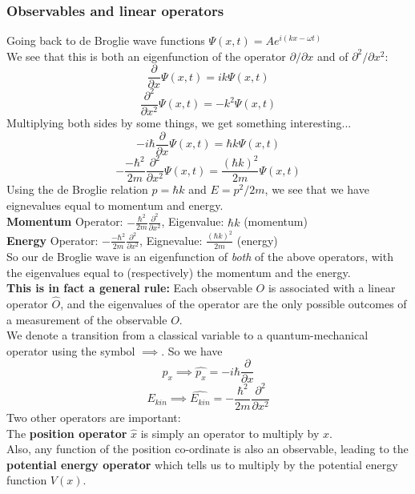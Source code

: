\documentclass{article}
\begin{document}
\subsubsection{Observables and linear operators}
Going back to de Broglie wave functions $\Psi(x,t) = Ae^{i(kx-\omega t)}$\\
We see that this is both an eigenfunction of the operator $\partial / \partial x$ and of $\partial^2 / \partial x^2$:
$$ \frac{\partial}
        {\partial x} \Psi(x,t) = ik \Psi(x,t) $$
$$ \frac{\partial^2}
        {\partial x^2} \Psi(x,t) = -k^2 \Psi(x,t) $$
Multiplying both sides by some things, we get something interesting...
$$ -i\hbar \frac{\partial}
                {\partial x} \Psi(x,t) = \hbar k \Psi(x,t) $$
$$ -\frac{-\hbar^2}
         {2m}      \frac{\partial^2}
                        {\partial x^2} \Psi(x,t) = \frac{(\hbar k)^2}
                                                        {2m} \Psi(x,t) $$
Using the de Broglie relation $p=\hbar k$ and $E=p^2/2m$, we see that we have eignevalues equal to momentum and energy.\\
\textbf{Momentum} Operator: $-\frac{\hbar^2}
                                   {2m}      \frac{\partial^2}
                                                  {\partial x^2}$, Eigenvalue: $\hbar k$ (momentum)\\
\textbf{Energy} Operator: $ -\frac{-\hbar^2}
                                  {2m}      \frac{\partial^2}
                                                 {\partial x^2}$, Eignevalue: $\frac{(\hbar k)^2}
                                                                                    {2m}$ (energy) \\
So our de Broglie wave is an eigenfunction of \emph{both} of the above operators, with the eigenvalues equal to (respectively) the momentum and the energy.\\
\textbf{This is in fact a general rule:} Each observable $O$ is associated with a linear operator $\hat{O}$, and the eigenvalues of the operator are the only possible outcomes of a measurement of the observable $O$.\\
We denote a transition from a classical variable to a quantum-mechanical operator using the symbol $\implies$. So we have
$$ p_x \implies \hat{p_x} = -i\hbar\frac{\partial}{\partial x} $$
$$ E_{kin} \implies \hat{E_{kin}} = -\frac{\hbar^2}{2m}\frac{\partial^2}{\partial x^2} $$
Two other operators are important:\\
The \textbf{position operator} $\hat{x}$ is simply an operator to multiply by $x$.\\
Also, any function of the position co-ordinate is also an observable, leading to the \textbf{potential energy operator} which tells us to multiply by the potential energy function $V(x)$.
\end{document}

